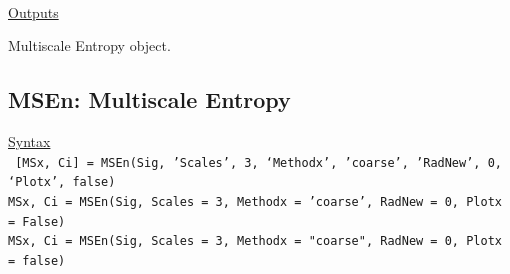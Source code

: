 \documentclass[12pt, a4paper, titlepage, openany]{book}
\begin{document}
\ \\ \noindent \ul{Outputs}
\begin{description}[labelsep=1cm, labelwidth=2cm, nosep, style=multiline,leftmargin=4cm]\footnotesize
\item[\texttt{Mobj}]		Multiscale Entropy object.
\end{description}



\newpage
\subsection{\normalsize MSEn: \hspace{15mm} Multiscale Entropy}
\noindent\ul{Syntax} \vspace{6mm} \\ \noindent \texttt{\footnotesize
[MSx, Ci] = MSEn(Sig, 'Scales', 3, ‘Methodx’, 'coarse', 'RadNew', 0, ‘Plotx’, false)\\
MSx, Ci = MSEn(Sig, Scales = 3, Methodx = 'coarse', RadNew = 0, Plotx = False)\\ 
MSx, Ci = MSEn(Sig, Scales = 3, Methodx = "coarse", RadNew = 0, Plotx = false)}
\end{document}
